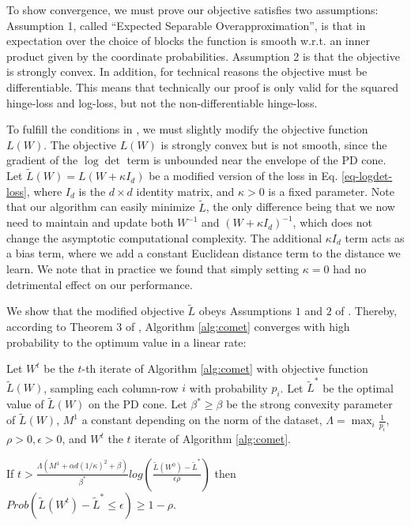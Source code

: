 \documentclass[twoside,11pt]{article}
\newcommand\mat[1]{{#1}}
\newcommand{\W}{\mat{W}}
\newcommand{\tL}{\tilde{L}(\W)}
\begin{document}
To show convergence, we must prove our objective satisfies two assumptions: Assumption 1, called ``Expected Separable Overapproximation'', is that in expectation over the choice of blocks the function is smooth w.r.t. an inner product given by the coordinate probabilities. Assumption 2 is that the objective is strongly convex. In addition, for technical reasons the objective must be differentiable. This means that technically our proof is only valid for the squared hinge-loss and log-loss, but not the non-differentiable hinge-loss.

To fulfill the conditions in \citep{richtarik2013optimal}, we must slightly modify the objective function $L({\W})$. The objective $L(\W)$ is strongly convex but is not smooth, since the gradient of the $\log \det$ term is unbounded near the envelope of the PD cone. Let $\tilde{L}({\W}) = L({\W + \kappa I_d})$ be a modified version of the loss in Eq. \ref{eq-logdet-loss}, where $I_d$ is the $d \times d$ identity matrix, and $\kappa>0$ is a fixed parameter.
Note that our algorithm can easily minimize $\tilde{L}$, the only difference being that we now need to maintain and update both $\W^{-1}$ and $(\W+\kappa I_d)^{-1}$, which does not change the asymptotic computational complexity. The additional $\kappa I_d$ term acts as a bias term, where we add a constant Euclidean distance term to the distance we learn. We note that in practice we found that simply setting $\kappa=0$ had no detrimental effect on our performance. 

We show that the modified objective $\tilde{L}$ obeys Assumptions $1$ and $2$ of \citet{richtarik2013optimal}. Thereby, according to Theorem 3 of \citeauthor{richtarik2013optimal}, Algorithm \ref{alg:comet} converges with high probability to the optimum value in a linear rate:

\begin{theorem}
Let $\W^t$ be the $t$-th iterate of Algorithm \ref{alg:comet} with objective function $\tL$, sampling each column-row $i$ with probability $p_i$. Let $\tilde{L}^*$ be the optimal value of $\tL$ on the PD cone. Let $\beta^* \geq \beta$ be the strong convexity parameter of $\tL$, $M^1$ a constant depending on the norm of the dataset, $\Lambda = \max_i \frac{1}{p_i}$, $\rho >0, \epsilon>0$, and $W^t$ the $t$ iterate of Algorithm \ref{alg:comet}.

If $t > \frac{\Lambda (M^1 + \alpha d (1/\kappa)^2 + \beta)}{\beta^*} log \left( \frac{\tilde{L}(W^0) - \tilde{L}^*}{\epsilon \rho}\right)$ then $Prob(\tilde{L}(\W^t) - \tilde{L}^* \leq \epsilon) \geq 1-\rho$.
\end{theorem}
\end{document}
